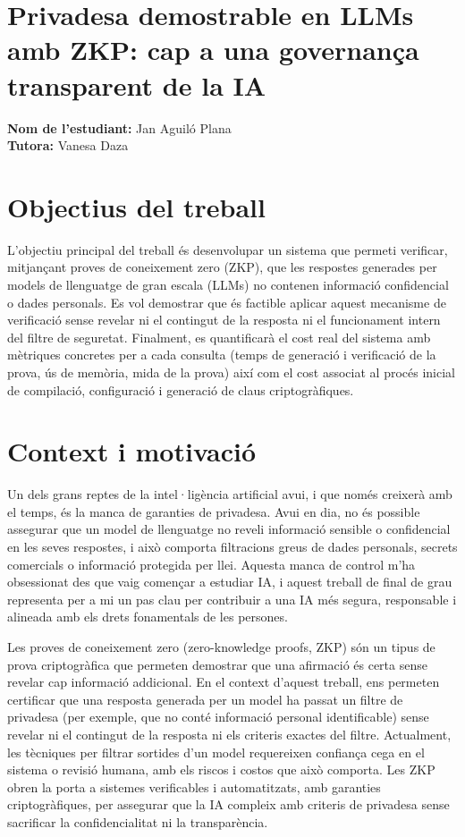 \documentclass[12pt]{article}
\begin{document}
\section*{Privadesa demostrable en LLMs amb ZKP: cap a una governança transparent de la IA}



\textbf{Nom de l'estudiant:} Jan Aguiló Plana \\
\textbf{Tutora:} Vanesa Daza

\section*{Objectius del treball}
L’objectiu principal del treball és desenvolupar un sistema que permeti verificar, mitjançant proves de coneixement zero (ZKP), que les respostes generades per models de llenguatge de gran escala (LLMs) no contenen informació confidencial o dades personals. Es vol demostrar que és factible aplicar aquest mecanisme de verificació sense revelar ni el contingut de la resposta ni el funcionament intern del filtre de seguretat. Finalment, es quantificarà el cost real del sistema amb mètriques concretes per a cada consulta (temps de generació i verificació de la prova, ús de memòria, mida de la prova) així com el cost associat al procés inicial de compilació, configuració i generació de claus criptogràfiques.


\section*{Context i motivació}

Un dels grans reptes de la intel·ligència artificial avui, i que només creixerà amb el temps, és la manca de garanties de privadesa. Avui en dia, no és possible assegurar que un model de llenguatge no reveli informació sensible o confidencial en les seves respostes, i això comporta filtracions greus de dades personals, secrets comercials o informació protegida per llei. Aquesta manca de control m’ha obsessionat des que vaig començar a estudiar IA, i aquest treball de final de grau representa per a mi un pas clau per contribuir a una IA més segura, responsable i alineada amb els drets fonamentals de les persones.

Les proves de coneixement zero (zero-knowledge proofs, ZKP) són un tipus de prova criptogràfica que permeten demostrar que una afirmació és certa sense revelar cap informació addicional. En el context d’aquest treball, ens permeten certificar que una resposta generada per un model ha passat un filtre de privadesa (per exemple, que no conté informació personal identificable) sense revelar ni el contingut de la resposta ni els criteris exactes del filtre. Actualment, les tècniques per filtrar sortides d’un model requereixen confiança cega en el sistema o revisió humana, amb els riscos i costos que això comporta. Les ZKP obren la porta a sistemes verificables i automatitzats, amb garanties criptogràfiques, per assegurar que la IA compleix amb criteris de privadesa sense sacrificar la confidencialitat ni la transparència.
\end{document}

